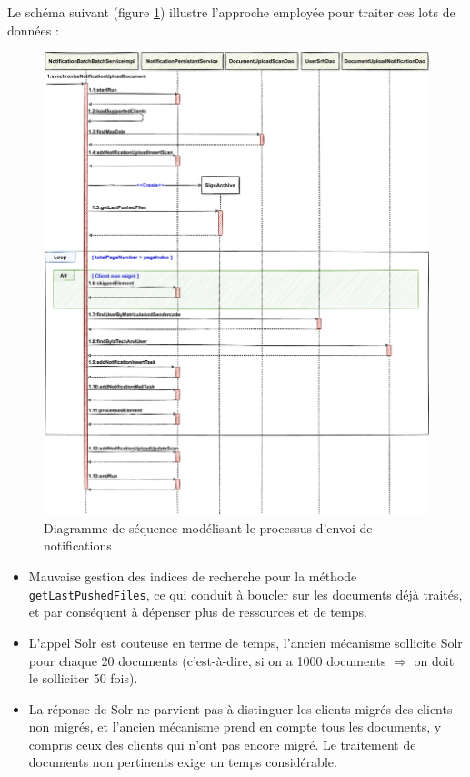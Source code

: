 Le schéma suivant (figure \ref{fig:seq}) illustre l'approche employée pour traiter ces lots de données :
\begin{figure}[H]
    \begin{center}
        \includegraphics[width=\linewidth]{images/sec4/seq.pdf}
        \caption{Diagramme de séquence modélisant le processus d'envoi de notifications}
        \label{fig:seq}
    \end{center}
\end{figure}
\begin{itemize}
    \item Mauvaise gestion des indices de recherche pour la méthode \lstinline|getLastPushedFiles|, ce qui conduit à boucler sur les documents déjà traités, et par conséquent à dépenser plus de ressources et de temps.\\

    \item L'appel Solr est couteuse en terme de temps, l'ancien mécanisme sollicite Solr pour chaque 20 documents (c'est-à-dire, si on a 1000 documents $\Longrightarrow$ on doit le solliciter 50 fois). 
    
    \item La réponse de Solr ne parvient pas à distinguer les clients migrés des clients non migrés, et l'ancien mécanisme prend en compte tous les documents, y compris ceux des clients qui n'ont pas encore migré. Le traitement de documents non pertinents exige un temps considérable.
\end{itemize}
